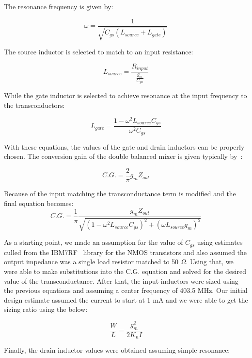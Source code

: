 The resonance frequency is given by:

\begin{equation}
\omega = \frac{1}{\sqrt{C_{gs}(L_{source}+L_{gate})}}
\end{equation}

The source inductor is selected to match to an input resistance:

\begin{equation}
L_{source} = \frac{R_{input}}{\frac{g_{m}}{C_{gs}}}
\end{equation}

While the gate inductor is selected to achieve resonance at the input frequency to the transconductors:

\begin{equation}
L_{gate}=\frac{1-\omega^{2}L_{source}C_{gs}}{\omega^{2}C_{gs}}
\end{equation}

With these equations, the values of the gate and drain inductors can be properly chosen.
The conversion gain of the double balanced mixer is given typically by~\cite{Razavi}:

\begin{equation}
C.G. = \frac{2}{\pi}g_{m}Z_{out}
\end{equation}

Because of the input matching the transconductance term is modified and the final equation becomes:
\begin{equation}
C.G. = \frac{1}{\pi}\frac{g_{m}Z_{out}}{\sqrt{(1-\omega^{2}L_{source}C_{gs})^{2}+(\omega L_{source}g_{m})^{2}}}
\end{equation}

As a starting point, we made an assumption for the value of $C_{gs}$ using estimates culled from the IBM7RF~\cite{ibm7rf} library for the NMOS transistors and also assumed the output impedance was a single load resistor matched to 50 $\Omega$. Using that, we were able to make substitutions into the C.G. equation and solved for the desired value of the transconductance. After that, the input inductors were sized using the previous equations and assuming a center frequency of 403.5 MHz. Our initial design estimate assumed the current to start at 1 mA and we were able to get the sizing ratio using the below:

\begin{equation}
\frac{W}{L} = \frac{g_{m}^2}{2K_{n}I}
\end{equation}

Finally, the drain inductor values were obtained assuming simple resonance:


